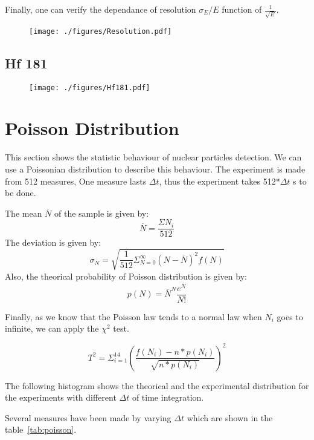 \documentclass[a4paper,12pt,oneside]{article}
\begin{document}
Finally, one can verify the dependance of resolution $\sigma_E/E$ function of $\frac{1}{\sqrt{E}}$.
\begin{figure}[H]
  \begin{center}
  \texttt{[image: ./figures/Resolution.pdf]}
  \caption{} \label{fig:resolution}
  \end{center}
\end{figure}

\subsection{Hf 181}
\begin{figure}[H]
  \begin{center}
  \texttt{[image: ./figures/Hf181.pdf]}
  \caption{} \label{fig:Hf181}
  \end{center}
\end{figure}

\section{Poisson Distribution}

This section shows the statistic behaviour of nuclear particles detection. We can use a Poissonian distribution to describe this behaviour.
The experiment is made from 512 measures, One measure lasts $\Delta t$, thus the experiment takes 512*$\Delta t$ s to be done.

The mean $\overline{N}$ of the sample is given by: $$\overline{N}=\frac{\Sigma N_i}{512}$$
The deviation is given by: $$\sigma_{\overline{N}}=\sqrt{\frac{1}{512}\Sigma^{\infty}_{N=0} (N-\overline{N})^2 f(N)}$$
Also, the theorical probability of Poisson distribution is given by: $$p(N)=\overline{N}^N \frac{e^{\overline{N}}}{N!}$$

Finally, as we know that the Poisson law tends to a normal law when $N_i$ goes to infinite, we can apply the $\chi^2$ test.

$$T^2=\Sigma^{14}_{i=1}{\left(\frac{f(N_i)-n*p(N_i)}{\sqrt{n*p(N_i)}}\right)^2}$$

The following histogram shows the theorical and the experimental distribution for the experiments with different $\Delta t$ of time integration.

Several measures have been made by varying $\Delta t$ which are shown in the table~\ref{tab:poisson}.
\end{document}
